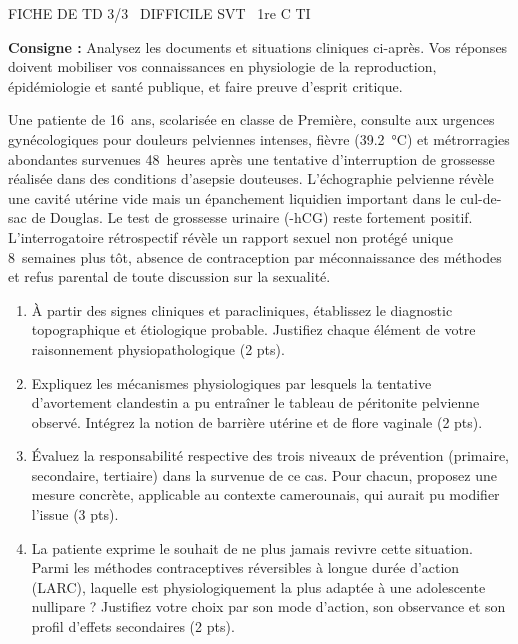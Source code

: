 \documentclass[11pt]{article}
\begin{document}
\begin{tcolorbox}[enhanced,colback=popink,colframe=popink,arc=10pt,boxrule=0pt,left=12pt,right=12pt,top=9pt,bottom=9pt]
{\color{white}\popxbold\small FICHE DE TD 3/3 \textbullet\ DIFFICILE \hfill SVT \textbullet\ 1re C TI\par}
\end{tcolorbox}
\vspace{4pt}
\noindent\textbf{Consigne :} Analysez les documents et situations cliniques ci-après. Vos réponses doivent mobiliser vos connaissances en physiologie de la reproduction, épidémiologie et santé publique, et faire preuve d'esprit critique.

\begin{exercice}
Une patiente de \SI{16}{ans}, scolarisée en classe de Première, consulte aux urgences gynécologiques pour douleurs pelviennes intenses, fièvre (\SI{39,2}{\celsius}) et métrorragies abondantes survenues \SI{48}{heures} après une tentative d'interruption de grossesse réalisée dans des conditions d'asepsie douteuses. L'échographie pelvienne révèle une cavité utérine vide mais un épanchement liquidien important dans le cul-de-sac de Douglas. Le test de grossesse urinaire (\beta-hCG) reste fortement positif. L'interrogatoire rétrospectif révèle un rapport sexuel non protégé unique \SI{8}{semaines} plus tôt, absence de contraception par méconnaissance des méthodes et refus parental de toute discussion sur la sexualité.
\begin{enumerate}
    \item À partir des signes cliniques et paracliniques, établissez le diagnostic topographique et étiologique probable. Justifiez chaque élément de votre raisonnement physiopathologique (2 pts).
    \item Expliquez les mécanismes physiologiques par lesquels la tentative d'avortement clandestin a pu entraîner le tableau de péritonite pelvienne observé. Intégrez la notion de barrière utérine et de flore vaginale (2 pts).
    \item Évaluez la responsabilité respective des trois niveaux de prévention (primaire, secondaire, tertiaire) dans la survenue de ce cas. Pour chacun, proposez une mesure concrète, applicable au contexte camerounais, qui aurait pu modifier l'issue (3 pts).
    \item La patiente exprime le souhait de ne plus jamais revivre cette situation. Parmi les méthodes contraceptives réversibles à longue durée d'action (LARC), laquelle est physiologiquement la plus adaptée à une adolescente nullipare ? Justifiez votre choix par son mode d'action, son observance et son profil d'effets secondaires (2 pts).
\end{enumerate}
\end{exercice}
\end{document}
